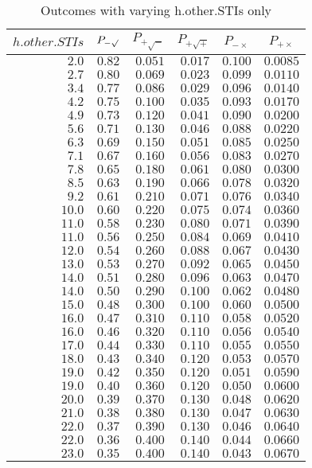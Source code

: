 %
\begin{table}[\hbtp]
 \small
 \begin{center}
 \begin{tabular}{rrrrrr}\hline\hline
\multicolumn{1}{c}{$h.other.STIs$}&\multicolumn{1}{c}{$P_{-\surd}$}&\multicolumn{1}{c}{$P_{+\surd - }$}&\multicolumn{1}{c}{$P_{+\surd +}$}&\multicolumn{1}{c}{$P_{-\times}$}&\multicolumn{1}{c}{$P_{+\times}$}\tabularnewline
\hline
$ 2.0$&$0.82$&$0.051$&$0.017$&$0.100$&$0.0085$\tabularnewline
$ 2.7$&$0.80$&$0.069$&$0.023$&$0.099$&$0.0110$\tabularnewline
$ 3.4$&$0.77$&$0.086$&$0.029$&$0.096$&$0.0140$\tabularnewline
$ 4.2$&$0.75$&$0.100$&$0.035$&$0.093$&$0.0170$\tabularnewline
$ 4.9$&$0.73$&$0.120$&$0.041$&$0.090$&$0.0200$\tabularnewline
$ 5.6$&$0.71$&$0.130$&$0.046$&$0.088$&$0.0220$\tabularnewline
$ 6.3$&$0.69$&$0.150$&$0.051$&$0.085$&$0.0250$\tabularnewline
$ 7.1$&$0.67$&$0.160$&$0.056$&$0.083$&$0.0270$\tabularnewline
$ 7.8$&$0.65$&$0.180$&$0.061$&$0.080$&$0.0300$\tabularnewline
$ 8.5$&$0.63$&$0.190$&$0.066$&$0.078$&$0.0320$\tabularnewline
$ 9.2$&$0.61$&$0.210$&$0.071$&$0.076$&$0.0340$\tabularnewline
$10.0$&$0.60$&$0.220$&$0.075$&$0.074$&$0.0360$\tabularnewline
$11.0$&$0.58$&$0.230$&$0.080$&$0.071$&$0.0390$\tabularnewline
$11.0$&$0.56$&$0.250$&$0.084$&$0.069$&$0.0410$\tabularnewline
$12.0$&$0.54$&$0.260$&$0.088$&$0.067$&$0.0430$\tabularnewline
$13.0$&$0.53$&$0.270$&$0.092$&$0.065$&$0.0450$\tabularnewline
$14.0$&$0.51$&$0.280$&$0.096$&$0.063$&$0.0470$\tabularnewline
$14.0$&$0.50$&$0.290$&$0.100$&$0.062$&$0.0480$\tabularnewline
$15.0$&$0.48$&$0.300$&$0.100$&$0.060$&$0.0500$\tabularnewline
$16.0$&$0.47$&$0.310$&$0.110$&$0.058$&$0.0520$\tabularnewline
$16.0$&$0.46$&$0.320$&$0.110$&$0.056$&$0.0540$\tabularnewline
$17.0$&$0.44$&$0.330$&$0.110$&$0.055$&$0.0550$\tabularnewline
$18.0$&$0.43$&$0.340$&$0.120$&$0.053$&$0.0570$\tabularnewline
$19.0$&$0.42$&$0.350$&$0.120$&$0.051$&$0.0590$\tabularnewline
$19.0$&$0.40$&$0.360$&$0.120$&$0.050$&$0.0600$\tabularnewline
$20.0$&$0.39$&$0.370$&$0.130$&$0.048$&$0.0620$\tabularnewline
$21.0$&$0.38$&$0.380$&$0.130$&$0.047$&$0.0630$\tabularnewline
$22.0$&$0.37$&$0.390$&$0.130$&$0.046$&$0.0640$\tabularnewline
$22.0$&$0.36$&$0.400$&$0.140$&$0.044$&$0.0660$\tabularnewline
$23.0$&$0.35$&$0.400$&$0.140$&$0.043$&$0.0670$\tabularnewline
\hline
\end{tabular}

\end{center}

\caption{Outcomes with varying h.other.STIs only\label{tbl:h.other.STIs_varying_only}} 

\end{table}

